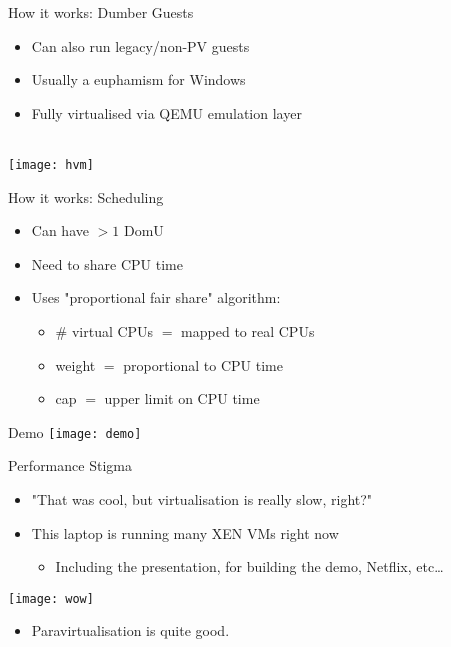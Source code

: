 \documentclass[xelatex]{beamer}
\begin{document}
\begin{frame}{How it works: Dumber Guests}
\begin{itemize}
\item Can also run legacy/non-PV guests
\item Usually a euphamism for Windows
\item Fully virtualised via QEMU emulation layer
\end{itemize}
~\\
\centering
\texttt{[image: hvm]}
\end{frame}

\begin{frame}{How it works: Scheduling}
\begin{itemize}
\item Can have $>1$ DomU
\item Need to share CPU time
\item Uses "proportional fair share" algorithm:
\begin{itemize}
\item \# virtual CPUs \hfill $=$ mapped to real CPUs
\item weight \hfill $=$ proportional to CPU time
\item cap \hfill $=$ upper limit on CPU time
\end{itemize}
\end{itemize}
\end{frame}

{
\begin{frame}
\end{frame}
}

\begin{frame}{Demo}
\centering
\texttt{[image: demo]}
\end{frame}

\begin{frame}{Performance Stigma}
\begin{itemize}
\item "That was cool, but virtualisation is really slow, right?"
\item This laptop is running many XEN VMs right now
\begin{itemize}
\item Including the presentation, for building the demo, Netflix, etc\ldots
\end{itemize}
\end{itemize}
\begin{center}
\vspace{-0.7cm}
\texttt{[image: wow]}
\end{center}
\vspace{-0.7cm}
\begin{itemize}
\item Paravirtualisation is quite good.
\end{itemize}
\end{frame}
\end{document}
